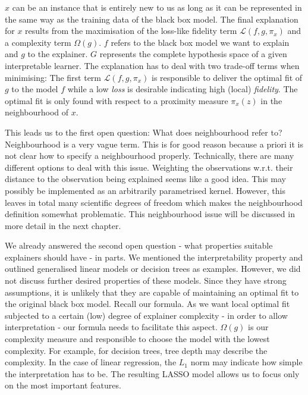 \documentclass[
]{krantz}
\begin{document}
\(x\) can be an instance that is entirely new to us as long as it can be represented in the same way as the training data of the black box model.
The final explanation for \(x\) results from the maximisation of the loss-like fidelity term \(\mathcal{L}\left(f, g, \pi_x \right)\) and a complexity term \(\Omega\left(g\right)\).
\(f\) refers to the black box model we want to explain and \(g\) to the explainer.
\(G\) represents the complete hypothesis space of a given interpretable learner.
The explanation has to deal with two trade-off terms when minimising:
The first term \(\mathcal{L}\left(f, g, \pi_x \right)\) is responsible to deliver the optimal fit of \(g\) to the model \(f\) while a low \emph{loss} is desirable indicating high (local) \emph{fidelity}.
The optimal fit is only found with respect to a proximity measure \(\pi_x(z)\) in the neighbourhood of \(x\).

This leads us to the first open question:
What does neighbourhood refer to?
Neighbourhood is a very vague term.
This is for good reason because a priori it is not clear how to specify a neighbourhood properly.
Technically, there are many different options to deal with this issue.
Weighting the observations w.r.t. their distance to the observation being explained seems like a good idea.
This may possibly be implemented as an arbitrarily parametrised kernel.
However, this leaves in total many scientific degrees of freedom which makes the neighbourhood definition somewhat problematic.
This neighbourhood issue will be discussed in more detail in the next chapter.

We already answered the second open question - what properties suitable explainers should have - in parts.
We mentioned the interpretability property and outlined generalised linear models or decision trees as examples.
However, we did not discuss further desired properties of these models.
Since they have strong assumptions, it is unlikely that they are capable of maintaining an optimal fit to the original black box model.
Recall our formula.
As we want local optimal fit subjected to a certain (low) degree of explainer complexity - in order to allow interpretation - our formula needs to facilitate this aspect.
\(\Omega\left(g\right)\) is our complexity measure and responsible to choose the model with the lowest complexity.
For example, for decision trees, tree depth may describe the complexity.
In the case of linear regression, the \(L_1\) norm may indicate how simple the interpretation has to be.
The resulting LASSO model allows us to focus only on the most important features.
\end{document}

